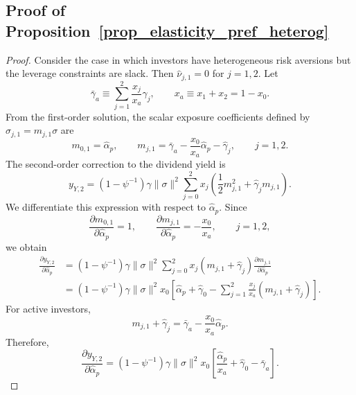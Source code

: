 
\subsection{Proof of Proposition~\ref{prop_elasticity_pref_heterog}}\label{app:prop_elasticity_pref_heterog}
\begin{proof}
Consider the case in which investors have heterogeneous risk aversions but the leverage constraints are slack.
Then $\hat{\nu}_{j,1}=0$ for $j=1,2$.
Let
\begin{equation}
    \bar{\gamma}_a \equiv \sum_{j=1}^2 \frac{x_j}{x_a}\hat{\gamma}_j,
    \qquad x_a\equiv x_1+x_2=1-x_0.
\end{equation}
From the first-order solution, the scalar exposure coefficients defined by $\sigma_{j,1}=m_{j,1}\sigma$ are
\begin{equation}
    m_{0,1}=\hat{\alpha}_p,
    \qquad
    m_{j,1}=\bar{\gamma}_a-\frac{x_0}{x_a}\hat{\alpha}_p-\hat{\gamma}_j,
    \qquad j=1,2.
\end{equation}
The second-order correction to the dividend yield is
\begin{equation}
    y_{Y,2}
    = (1-\psi^{-1})\gamma\|\sigma\|^2
    \sum_{j=0}^2 x_j\left(\frac{1}{2}m_{j,1}^2+\hat{\gamma}_j m_{j,1}\right).
\end{equation}
We differentiate this expression with respect to $\hat{\alpha}_p$.
Since
\begin{equation}
    \frac{\partial m_{0,1}}{\partial \hat{\alpha}_p}=1,
    \qquad
    \frac{\partial m_{j,1}}{\partial \hat{\alpha}_p}=-\frac{x_0}{x_a},
    \qquad j=1,2,
\end{equation}
we obtain
\begin{align}
    \frac{\partial y_{Y,2}}{\partial \hat{\alpha}_p}
    &= (1-\psi^{-1})\gamma\|\sigma\|^2
    \sum_{j=0}^2 x_j(m_{j,1}+\hat{\gamma}_j)
    \frac{\partial m_{j,1}}{\partial \hat{\alpha}_p} \nonumber\\
    &= (1-\psi^{-1})\gamma\|\sigma\|^2 x_0
    \left[\hat{\alpha}_p+\hat{\gamma}_0
    -\sum_{j=1}^2 \frac{x_j}{x_a}(m_{j,1}+\hat{\gamma}_j)\right].
\end{align}
For active investors,
\begin{equation}
    m_{j,1}+\hat{\gamma}_j
    = \bar{\gamma}_a-\frac{x_0}{x_a}\hat{\alpha}_p.
\end{equation}
Therefore,
\begin{equation}
    \frac{\partial y_{Y,2}}{\partial \hat{\alpha}_p}
    = (1-\psi^{-1})\gamma\|\sigma\|^2 x_0
    \left[\frac{\hat{\alpha}_p}{x_a}+\hat{\gamma}_0-\bar{\gamma}_a\right].
\end{equation}


\end{proof}
